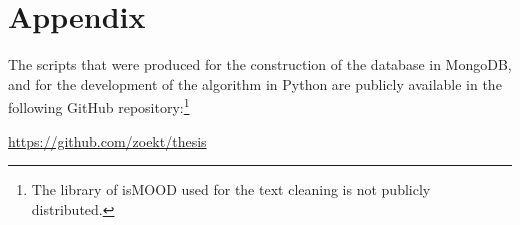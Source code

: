 \chapter*{Appendix}
\label{apdx:appendix}

The scripts that were produced
for the construction of the database in MongoDB,
and for the development of the algorithm in Python
are publicly available in the following GitHub repository:\footnote {The library of isMOOD used for the text cleaning is not publicly distributed.}

\url{https://github.com/zoekt/thesis}

